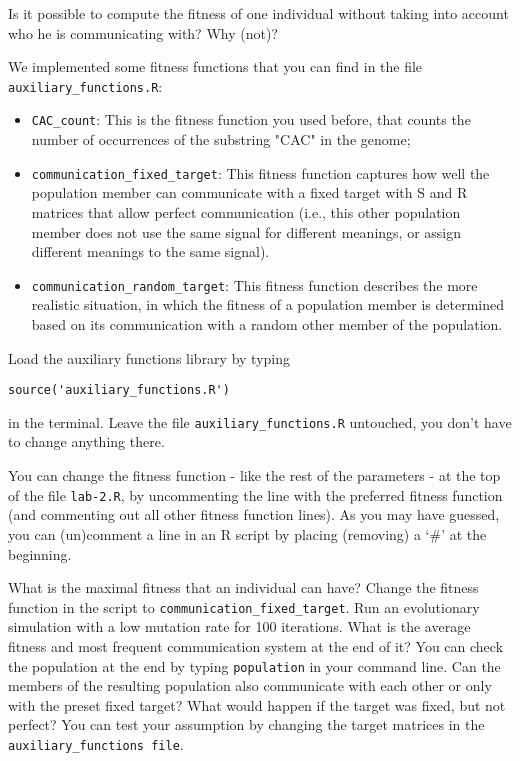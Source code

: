\documentclass[a4paper, 9pt]{article}
\begin{document}
\begin{exercise}
 \ask Is it possible to compute the fitness of one individual without taking into account who he is communicating with? Why (not)?
 \end{exercise}

We implemented some fitness functions that you can find in the file
\texttt{auxiliary\_functions.R}:

\begin{itemize}
\item \texttt{CAC\_count}: This is the fitness function you used before, that counts the number of occurrences of the substring "CAC" in the genome;
\item \texttt{communication\_fixed\_target}: This fitness function captures how well the population member can communicate with a fixed target with S and R matrices that allow perfect communication (i.e., this other population member does not use the same signal for different meanings, or assign different meanings to the same signal).
\item \texttt{communication\_random\_target}: This fitness function describes the more realistic situation, in which the fitness of a population member is determined based on its communication with a random other member of the population.
\end{itemize}

\begin{exercise}
\action Load the auxiliary functions library by typing 
\begin{lstlisting}
source('auxiliary_functions.R')
\end{lstlisting}
in the terminal. Leave the file \texttt{auxiliary\_functions.R} untouched, you don't have to change anything there.
\end{exercise}

You can change the fitness function - like the rest of the parameters -
at the top of the file \texttt{lab-2.R}, by uncommenting the line with
the preferred fitness function (and commenting out all other fitness
function lines). As you may have guessed, you can (un)comment a line in
an R script by placing (removing) a `\#' at the beginning.

\begin{exercise}
\ask What is the maximal fitness that an individual can have?
\action Change the fitness function in the script to \texttt{communication\_fixed\_target}. Run an evolutionary simulation with a low mutation rate for 100 iterations. What is the average fitness and most frequent communication system at the end of it? You can check the population at the end by typing \texttt{population} in your command line.
\ask Can the members of the resulting population also communicate with each other or only with the preset fixed target?
\ask What would happen if the target was fixed, but not perfect? You can test your assumption by changing the target matrices in the \texttt{auxiliary\_functions file}. 
\end{exercise}
\end{document}
